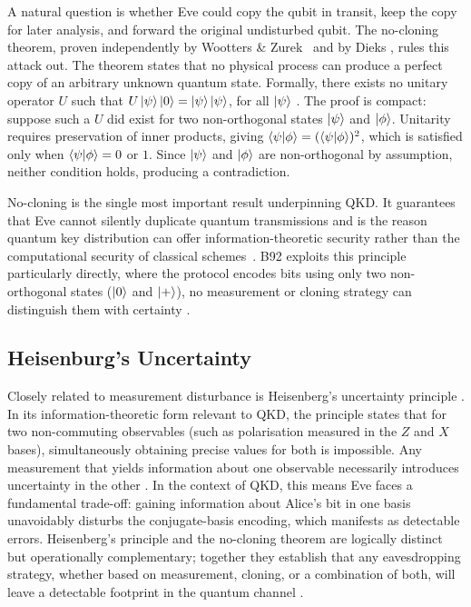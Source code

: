 \documentclass[10pt, a4paper]{report}
\begin{document}
A natural question is whether Eve could copy the qubit in transit, keep the copy for later analysis, and forward the original undisturbed qubit. The no-cloning theorem, proven independently by Wootters \& Zurek~\cite{WZ1982} and by Dieks \cite{Dieks1982}, rules this attack out. The theorem states that no physical process can produce a perfect copy of an arbitrary unknown quantum state. Formally, there exists no unitary operator $U$ such that $U\ket{\psi}\ket{0} = \ket{\psi}\ket{\psi}$, for all $\ket{\psi}$ \cite{QKDbible}. The proof is compact: suppose such a $U$ did exist for two non-orthogonal states $\ket{\psi}$ and $\ket{\phi}$. Unitarity requires preservation of inner products, giving $\braket{\psi|\phi} = (\braket{\psi|\phi})^{2}$, which is satisfied only when $\braket{\psi|\phi} = 0$ or $1$. Since $\ket{\psi}$ and $\ket{\phi}$ are non-orthogonal by assumption, neither condition holds, producing a contradiction.

No-cloning is the single most important result underpinning QKD. It guarantees that Eve cannot silently duplicate quantum transmissions and is the reason quantum key distribution can offer information-theoretic security rather than the computational security of classical schemes~\cite{ekertQI}. B92 exploits this principle particularly directly, where the protocol encodes bits using only two non-orthogonal states ($\ket{0}$ and $\ket{+}$), no measurement or cloning strategy can distinguish them with certainty \cite{B92}.

\subsection{Heisenburg's Uncertainty}

Closely related to measurement disturbance is Heisenberg's uncertainty principle \cite{Heisenberg1927}. In its information-theoretic form relevant to QKD, the principle states that for two non-commuting observables (such as polarisation measured in
the $Z$ and $X$ bases), simultaneously obtaining precise values for both is impossible. Any measurement that yields information about one observable necessarily introduces uncertainty in the other \cite{QKDbible}. In the context of QKD, this means Eve faces a fundamental trade-off: gaining information about Alice's bit in one basis unavoidably disturbs the conjugate-basis encoding, which manifests as detectable errors. Heisenberg's principle and the no-cloning theorem are logically distinct but operationally complementary; together they establish that any eavesdropping strategy, whether based on measurement, cloning, or a combination of both, will leave a detectable footprint in the quantum channel \cite{Scarani2009}. 
\end{document}
